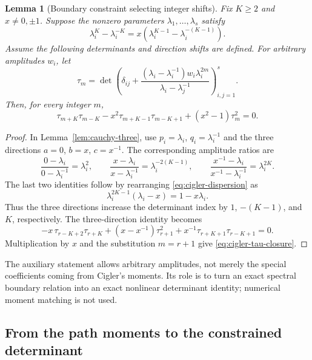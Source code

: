 \documentclass[11pt,a4paper]{article}
\newtheorem{lemma}[theorem]{Lemma}
\theoremstyle{definition}\newtheorem{definition}[theorem]{Definition}
\theoremstyle{remark}\newtheorem{remark}[theorem]{Remark}
\begin{document}
\begin{lemma}[Boundary constraint selecting integer shifts]
\label{lem:cigler-spectral-closure}
Fix $K\geq2$ and $x\ne0,\pm1$. Suppose the nonzero parameters
$\lambda_1,\ldots,\lambda_s$ satisfy
\begin{equation}\label{eq:cigler-dispersion}
 \lambda_i^K-\lambda_i^{-K}
       =x(\lambda_i^{K-1}-\lambda_i^{-(K-1)}).
\end{equation}
Assume the following determinants and direction shifts are defined.
For arbitrary amplitudes $w_i$, let
\[
 \tau_m=\det\left(\delta_{ij}
       +\frac{(\lambda_i-\lambda_i^{-1})w_i\lambda_i^{2m}}
                    {\lambda_i-\lambda_j^{-1}}\right)_{i,j=1}^s.
\]
Then, for every integer $m$,
\begin{equation}\label{eq:cigler-tau-closure}
 \tau_{m+K}\tau_{m-K}
       -x^2\tau_{m+K-1}\tau_{m-K+1}
       +(x^2-1)\tau_m^2=0.
\end{equation}
\end{lemma}
\begin{proof}
In Lemma~\ref{lem:cauchy-three}, use
$p_i=\lambda_i$, $q_i=\lambda_i^{-1}$ and the three directions
$a=0$, $b=x$, $c=x^{-1}$. The corresponding amplitude ratios are
\[
 \frac{0-\lambda_i}{0-\lambda_i^{-1}}=\lambda_i^2,
 \qquad
 \frac{x-\lambda_i}{x-\lambda_i^{-1}}=\lambda_i^{-2(K-1)},
 \qquad
 \frac{x^{-1}-\lambda_i}{x^{-1}-\lambda_i^{-1}}=\lambda_i^{2K}.
\]
The last two identities follow by rearranging
\eqref{eq:cigler-dispersion} as
\[
 \lambda_i^{2K-1}(\lambda_i-x)=1-x\lambda_i.
\]
Thus the three directions increase the determinant index by
$1$, $-(K-1)$, and $K$, respectively. The three-direction identity becomes
\[
 -x\,\tau_{r-K+2}\tau_{r+K}
 +(x-x^{-1})\tau_{r+1}^2
 +x^{-1}\tau_{r+K+1}\tau_{r-K+1}=0.
\]
Multiplication by $x$ and the substitution $m=r+1$ give
\eqref{eq:cigler-tau-closure}.
\end{proof}

The auxiliary statement allows arbitrary amplitudes, not merely the
special coefficients coming from Cigler's moments. Its role is to turn
an exact spectral boundary relation into an exact nonlinear determinant
identity; numerical moment matching is not used.

\subsection{From the path moments to the constrained determinant}
\end{document}
